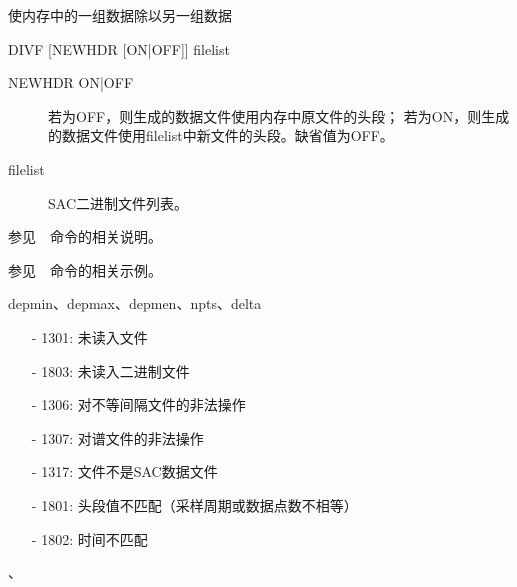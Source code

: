 \label{cmd:divf}

使内存中的一组数据除以另一组数据

\begin{SACSTX}
DIVF [NEWHDR [ON|OFF]] filelist
\end{SACSTX}

\begin{description}
\item [NEWHDR ON|OFF] 若为OFF，则生成的数据文件使用内存中原文件的头段；          
    若为ON，则生成的数据文件使用filelist中新文件的头段。缺省值为OFF。
\item [filelist] SAC二进制文件列表。
\end{description}

参见~~命令的相关说明。

参见~~命令的相关示例。

depmin、depmax、depmen、npts、delta

\begin{itemize}
\item[-]1301: 未读入文件
\item[-]1803: 未读入二进制文件
\item[-]1306: 对不等间隔文件的非法操作
\item[-]1307: 对谱文件的非法操作
\item[-]1317: 文件不是SAC数据文件
\item[-]1801: 头段值不匹配（采样周期或数据点数不相等）
\end{itemize}

\begin{itemize}
\item[-]1802: 时间不匹配
\end{itemize}

、

